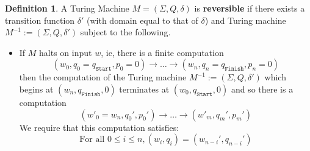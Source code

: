 \documentclass[12pt]{article}
\theoremstyle{plain}
\theoremstyle{definition}
\newtheorem{defn}[thm]{Definition} %
\newcommand{\lto}{\longrightarrow}
\begin{document}
\begin{defn}\label{def:reversible_machine}
	A Turing Machine $M = (\Sigma, Q, \delta)$ is \textbf{reversible} if there exists a transition function $\delta'$ (with domain equal to that of $\delta$) and Turing machine $M^{-1} := (\Sigma, Q, \delta')$ subject to the following.
	\begin{itemize}
		\item If $M$ halts on input $w$, ie, there is a finite computation
		\begin{equation}
			(w_0, q_0 = q_{\texttt{Start}}, p_0 = 0) \lto \ldots \lto (w_n, q_n = q_\texttt{Finish}, p_n = 0)
		\end{equation}
		then the computation of the Turing machine $M^{-1} := (\Sigma, Q, \delta')$ which begins at $(w_n, q_{\texttt{Finish}}, 0)$ terminates at $(w_0, q_{\texttt{Start}}, 0)$ and so there is a computation
		\begin{equation}
			(w'_0 = w_n, q_0', p_0') \lto \ldots \lto (w'_m, q_m', p_m')
		\end{equation}	
		We require that this computation satisfies:
		\begin{equation}
			\text{For all }0 \leq i \leq n, (w_i, q_i) = (w_{n-i}', q_{n-i}')
		\end{equation}
	\end{itemize}
\end{defn}
\end{document}
